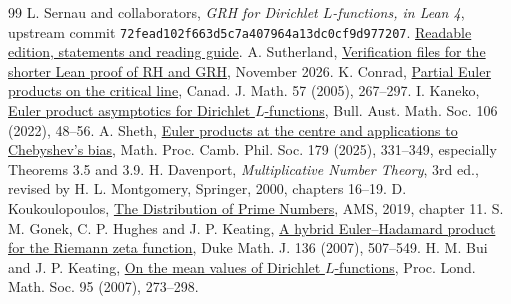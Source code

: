 \documentclass[11pt]{article}
\begin{document}
\begin{thebibliography}{99}\small
{} L. Sernau and collaborators, \emph{GRH for Dirichlet $L$-functions, in Lean 4}, upstream commit \texttt{72fead102f663d5c7a407964a13dc0cf9d977207}. \href{https://github.com/lsernau/grh-lean/tree/72fead102f663d5c7a407964a13dc0cf9d977207/grh}{Readable edition, statements and reading guide}.
 A. Sutherland, \href{https://math.mit.edu/~drew/shortgrh/}{Verification files for the shorter Lean proof of RH and GRH}, November 2026.
 K. Conrad, \href{https://doi.org/10.4153/CJM-2005-012-6}{Partial Euler products on the critical line}, Canad. J. Math. 57 (2005), 267--297.
 I. Kaneko, \href{https://arxiv.org/abs/1902.04203}{Euler product asymptotics for Dirichlet $L$-functions}, Bull. Aust. Math. Soc. 106 (2022), 48--56.
 A. Sheth, \href{https://doi.org/10.1017/S0305004125000234}{Euler products at the centre and applications to Chebyshev's bias}, Math. Proc. Camb. Phil. Soc. 179 (2025), 331--349, especially Theorems 3.5 and 3.9.
 H. Davenport, \emph{Multiplicative Number Theory}, 3rd ed., revised by H. L. Montgomery, Springer, 2000, chapters 16--19.
 D. Koukoulopoulos, \href{https://dms.umontreal.ca/~koukoulo/documents/publications/primes.pdf}{The Distribution of Prime Numbers}, AMS, 2019, chapter 11.
 S. M. Gonek, C. P. Hughes and J. P. Keating, \href{https://doi.org/10.1215/S0012-7094-07-13634-2}{A hybrid Euler--Hadamard product for the Riemann zeta function}, Duke Math. J. 136 (2007), 507--549.
 H. M. Bui and J. P. Keating, \href{https://academic.oup.com/plms/article-abstract/95/2/273/1497660}{On the mean values of Dirichlet $L$-functions}, Proc. Lond. Math. Soc. 95 (2007), 273--298.
\end{thebibliography}
\end{document}
